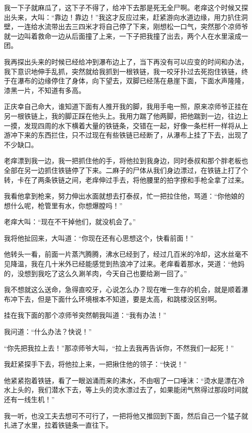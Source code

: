 我一下子就麻瓜了，这下子不得了，给冲下去那是死无全尸啊。老痒这个时候又探出头来，大叫：“靠边！靠边！”我这才反应过来，赶紧游向水道边缘，用力扒住洞壁，一连给水流带出去三四米才将自己停了下来，刚想松一口气，突然那个凉师爷就一边叫着救命一边从后面撞了上来，一下子把我撞了出去，两个人在水里滚成一团。

我再探出头来的时候已经给冲到瀑布边上了，当下再没有可以应变的时间和办法，我下意识地伸手乱抓，突然就给我抓到一根铁链，我一咬牙扑过去死抱住铁链，终于在瀑布的边缘停住了身体，向下望去，双脚已经荡在悬崖下面，下面水声隆隆，漆黑一片，不知道有多高。

正庆幸自己命大，谁知道下面有人推开我的脚，我用手电一照，原来凉师爷正挂在另一根铁链上，我的脚正踩在他头上。我用力踹了他两脚，把他踹到一边，往边上一摸，发现四周的水下横着大量的铁链条，交错在一起，好像一条栏杆一样将从上游冲下来的东西拦住，只不过现在有些铁链已经断了，从瀑布上挂了下去，出现了不少缺口。

老痒漂到我一边，我一把抓住他的手，将他拉到我身边，同时泰叔和那个胖老板也全部在另一边抓住铁链停了下来。二麻子的尸体从我们身边漂过，在铁链上打了个转，卡在了两条铁链之间，老痒伸过手去，将他腰里的拍字撩和手枪全拿了过来。

我看他拿到枪来，努力伸出水面就想去打泰叔，忙一把拉住他，骂道：“你他娘的想什么呢，枪管里有水，你想爆膛吗！”

老痒大叫：“现在不干掉他们，就没机会了。”

我将他扯回来，大叫道：“你现在还有心思想这个，快看前面！”

他转头一看，前面一片蒸汽腾腾，沸水已经到了，经过几百米的冷却，这水丝毫不见降温，我在几十米外已经能感觉到热浪冲了过来。老痒看着那水，哭道：“他妈的，没想到我吃了这么久涮羊肉，今天自己也要给涮一回了。”

我不想就这么送命，急得直咬牙，心说怎么办？现在唯一生存的机会，就是顺着瀑布冲下去，但是下面什么环境根本不知道，要是太高，和跳楼没区别啊。

挂在我下面的那个凉师爷突然朝我叫道：“我有办法！”

我问道：“什么办法？快说！”

“你先把我拉上去！”那凉师爷大叫，“拉上去我再告诉你，不然我们一起死！”

我赶紧探手下去，将他拉上来，一把揪住他的领子：“快说！”

他紧紧抱着铁链，看了一眼汹涌而来的沸水，不由咽了一口唾沫：“烫水是漂在冷水上头的，我们潜水下去，等上头的烫水漂过去了，如果能闭气熬得过那段时间就还有一线生机！”

我一听，也没工夫去想可不可行了，一把将他又推回到下面，然后自己一个猛子就扎进了水里，拉着铁链条一直往下。

